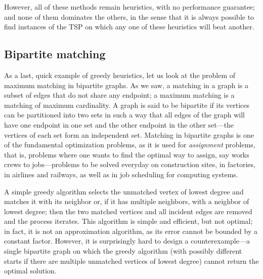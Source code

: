 \documentclass[11pt]{article}
\begin{document}
However, all of these methods remain heuristics, with no performance
guarantee; and none of them dominates the others, in the sense that
it is always possible to find instances of the TSP on which any one of
these heuristics will beat another.

\subsection{Bipartite matching}
As a last, quick example of greedy heuristics, let us look at the
problem of maximum matching in bipartite graphs.  As we saw, a matching
in a graph is a subset of edges that do not share any endpoint; a
maximum matching is a matching of maximum cardinality.   A graph is
said to be bipartite if its vertices can be partitioned into two sets
in such a way that all edges of the graph will have one endpoint in
one set and the other endpoint in the other set---the vertices of each
set form an independent set.  Matching in bipartite graphs is one of
the fundamental optimization problems, as it is used for \emph{assignment}
problems, that is, problems where one wants to find the optimal way
to assign, say works crews to jobs---problems to be solved everyday
on construction sites, in factories, in airlines and railways, as well as
in job scheduling for computing systems.

A simple greedy algorithm selects the unmatched vertex of lowest degree
and matches it with its neighbor or, if it has multiple neighbors, with
a neighbor of lowest degree; then the two matched vertices and all incident
edges are removed and the process iterates.  This algorithm is simple and
efficient, but not optimal; in fact, it is not an approximation algorithm,
as its error cannot be bounded by a constant factor.  However, it is
surprisingly hard to design a counterexample---a single bipartite graph
on which the greedy algorithm (with possibly different starts if there
are multiple unmatched vertices of lowest degree) cannot return the
optimal solution.
\end{document}
